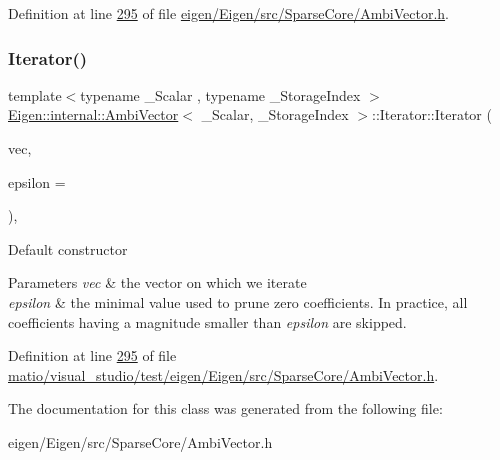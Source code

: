 Definition at line \hyperlink{eigen_2_eigen_2src_2_sparse_core_2_ambi_vector_8h_source_l00295}{295} of file \hyperlink{eigen_2_eigen_2src_2_sparse_core_2_ambi_vector_8h_source}{eigen/\+Eigen/src/\+Sparse\+Core/\+Ambi\+Vector.\+h}.

\mbox{\label{class_eigen_1_1internal_1_1_ambi_vector_1_1_iterator_a2201eecfa8e104d9f2017e47c5f24583}} 
\subsubsection{\texorpdfstring{Iterator()}{Iterator()}\hspace{0.1cm}{\footnotesize\ttfamily [2/2]}}
{\footnotesize\ttfamily template$<$typename \+\_\+\+Scalar , typename \+\_\+\+Storage\+Index $>$ \\
\hyperlink{class_eigen_1_1internal_1_1_ambi_vector}{Eigen\+::internal\+::\+Ambi\+Vector}$<$ \+\_\+\+Scalar, \+\_\+\+Storage\+Index $>$\+::Iterator\+::\+Iterator (\begin{DoxyParamCaption}\item[{const \hyperlink{class_eigen_1_1internal_1_1_ambi_vector}{Ambi\+Vector} \&}]{vec,  }\item[{const Real\+Scalar \&}]{epsilon = {} }\end{DoxyParamCaption})\hspace{0.3cm}{\ttfamily [inline]}, {\ttfamily [explicit]}}

Default constructor 
\begin{DoxyParams}{Parameters}
{\em vec} & the vector on which we iterate \\
\hline
{\em epsilon} & the minimal value used to prune zero coefficients. In practice, all coefficients having a magnitude smaller than {\itshape epsilon} are skipped. \\
\hline
\end{DoxyParams}


Definition at line \hyperlink{matio_2visual__studio_2test_2eigen_2_eigen_2src_2_sparse_core_2_ambi_vector_8h_source_l00295}{295} of file \hyperlink{matio_2visual__studio_2test_2eigen_2_eigen_2src_2_sparse_core_2_ambi_vector_8h_source}{matio/visual\+\_\+studio/test/eigen/\+Eigen/src/\+Sparse\+Core/\+Ambi\+Vector.\+h}.



The documentation for this class was generated from the following file\+:\begin{DoxyCompactItemize}
\item 
eigen/\+Eigen/src/\+Sparse\+Core/\+Ambi\+Vector.\+h\end{DoxyCompactItemize}
